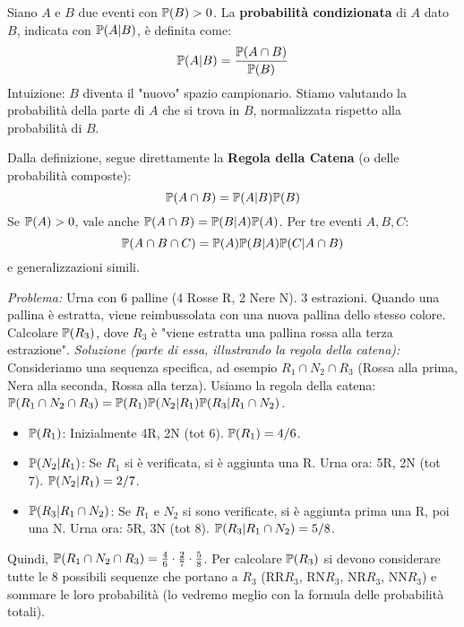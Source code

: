 \documentclass[12pt,a4paper]{article}
\begin{document}
\begin{definition}
Siano $A$ e $B$ due eventi con $\mathbb{P}(B) > 0$. La \textbf{probabilità condizionata} di $A$ dato $B$, indicata con $\mathbb{P}(A|B)$, è definita come:
\[ \mathbb{P}(A|B) = \frac{\mathbb{P}(A \cap B)}{\mathbb{P}(B)} \]
Intuizione: $B$ diventa il "nuovo" spazio campionario. Stiamo valutando la probabilità della parte di $A$ che si trova in $B$, normalizzata rispetto alla probabilità di $B$.
\end{definition}

Dalla definizione, segue direttamente la \textbf{Regola della Catena} (o delle probabilità composte):
\[ \mathbb{P}(A \cap B) = \mathbb{P}(A|B) \mathbb{P}(B) \]
Se $\mathbb{P}(A)>0$, vale anche $\mathbb{P}(A \cap B) = \mathbb{P}(B|A) \mathbb{P}(A)$.
Per tre eventi $A, B, C$:
\[ \mathbb{P}(A \cap B \cap C) = \mathbb{P}(A) \mathbb{P}(B|A) \mathbb{P}(C|A \cap B) \]
e generalizzazioni simili.

\begin{example}
\textit{Problema:} Urna con 6 palline (4 Rosse R, 2 Nere N). 3 estrazioni. Quando una pallina è estratta, viene reimbussolata con una nuova pallina dello stesso colore. Calcolare $\mathbb{P}(R_3)$, dove $R_3$ è "viene estratta una pallina rossa alla terza estrazione".
\textit{Soluzione (parte di essa, illustrando la regola della catena):}
Consideriamo una sequenza specifica, ad esempio $R_1 \cap N_2 \cap R_3$ (Rossa alla prima, Nera alla seconda, Rossa alla terza).
Usiamo la regola della catena: $\mathbb{P}(R_1 \cap N_2 \cap R_3) = \mathbb{P}(R_1) \mathbb{P}(N_2|R_1) \mathbb{P}(R_3|R_1 \cap N_2)$.
\begin{itemize}
    \item $\mathbb{P}(R_1)$: Inizialmente 4R, 2N (tot 6). $\mathbb{P}(R_1) = 4/6$.
    \item $\mathbb{P}(N_2|R_1)$: Se $R_1$ si è verificata, si è aggiunta una R. Urna ora: 5R, 2N (tot 7). $\mathbb{P}(N_2|R_1) = 2/7$.
    \item $\mathbb{P}(R_3|R_1 \cap N_2)$: Se $R_1$ e $N_2$ si sono verificate, si è aggiunta prima una R, poi una N. Urna ora: 5R, 3N (tot 8). $\mathbb{P}(R_3|R_1 \cap N_2) = 5/8$.
\end{itemize}
Quindi, $\mathbb{P}(R_1 \cap N_2 \cap R_3) = \frac{4}{6} \cdot \frac{2}{7} \cdot \frac{5}{8}$.
Per calcolare $\mathbb{P}(R_3)$ si devono considerare tutte le 8 possibili sequenze che portano a $R_3$ (RR$R_3$, RN$R_3$, NR$R_3$, NN$R_3$) e sommare le loro probabilità (lo vedremo meglio con la formula delle probabilità totali).
\end{example}
\end{document}
